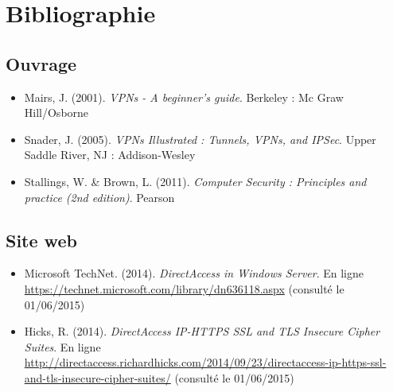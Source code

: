 \chapter*{Bibliographie}
\section*{Ouvrage}
\begin{itemize}
\item Mairs, J. (2001). \textit{VPNs - A beginner's guide}. Berkeley : Mc Graw Hill/Osborne
\item Snader, J. (2005). \textit{VPNs Illustrated : Tunnels, VPNs, and IPSec}. Upper Saddle River, NJ : Addison-Wesley 
\item Stallings, W. \& Brown, L. (2011). \textit{Computer Security : Principles and practice (2nd edition)}. Pearson
\end{itemize}
\section*{Site web}
\begin{itemize}
\item Microsoft TechNet. (2014). \textit{DirectAccess in Windows Server}. En ligne \url{https://technet.microsoft.com/library/dn636118.aspx} (consulté le 01/06/2015)
\item Hicks, R. (2014). \textit{DirectAccess IP-HTTPS SSL and TLS Insecure Cipher Suites}. En ligne \url{http://directaccess.richardhicks.com/2014/09/23/directaccess-ip-https-ssl-and-tls-insecure-cipher-suites/} (consulté le 01/06/2015)
\end{itemize}